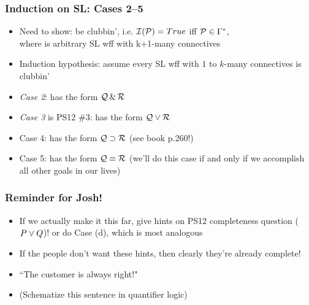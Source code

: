 \begin{frame}
\frametitle{Induction on SL: Cases 2--5}

\begin{itemize}[<+->]

\item Need to show:  be clubbin', i.e. $\mathcal{I}(\mathcal{P}) = True$ iff $\mathcal{P} \in \Gamma^{\ast}$, \\ where  is arbitrary SL wff with k+1-many connectives

\item \alert{Induction hypothesis}: assume every SL wff with $1$ to $k$-many connectives is clubbin' 

\item \emph{Case 2}:  has the form $\mathcal{Q} \,\&\, \mathcal{R}$


\item \emph{Case 3} is PS12 \#3:  has the form $\mathcal{Q} \vee \mathcal{R}$

\item Case 4:  has the form $\mathcal{Q} \supset \mathcal{R}$ (see book p.260!)

\item Case 5:  has the form $\mathcal{Q} \equiv \mathcal{R}$ (we'll do this case if and only if we accomplish all other goals in our lives)



\end{itemize}
\end{frame}


\begin{frame}
\frametitle{Reminder for Josh!}

\begin{itemize}[<+->]

\item If we actually make it this far, give hints on PS12 completeness question ($P \vee Q$)! or do Case (d), which is most analogous 

\item If the people don't want these hints, then clearly they're already complete!

\item ``The customer is always right!"

\item (Schematize this sentence in quantifier logic)


\end{itemize}
\end{frame}





